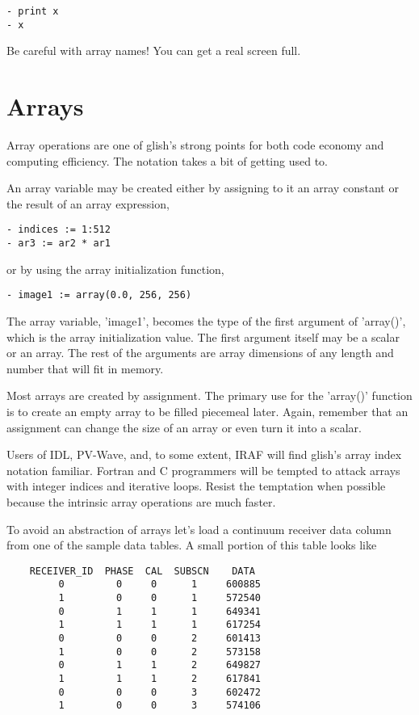 \begin{verbatim}
- print x
- x
\end{verbatim}

Be careful with array names!  You can get a real screen full.

\section{Arrays}

    Array operations are one of glish's strong points for both code economy
and computing efficiency.  The notation takes a bit of getting used to.

    An array variable may be created either by assigning to it an array
constant or the result of an array expression,

\begin{verbatim}
- indices := 1:512
- ar3 := ar2 * ar1
\end{verbatim}

or by using the array initialization function,

\begin{verbatim}
- image1 := array(0.0, 256, 256)
\end{verbatim}

The array variable, 'image1', becomes the type of the first argument of
'array()', which is the array initialization value.  The first argument
itself may be a scalar or an array.  The rest of the arguments are array
dimensions of any length and number that will fit in memory.

    Most arrays are created by assignment.  The primary use for the
'array()' function is to create an empty array to be filled piecemeal
later.  Again, remember that an assignment can change the size of an array
or even turn it into a scalar.

    Users of IDL, PV-Wave, and, to some extent, IRAF will find glish's
array index notation familiar.  Fortran and C programmers will be tempted
to attack arrays with integer indices and iterative loops.  Resist the
temptation when possible because the intrinsic array operations are much
faster.

    To avoid an abstraction of arrays let's load a continuum receiver data
column from one of the sample data tables.  A small portion of this table
looks like

\begin{verbatim}
	RECEIVER_ID  PHASE  CAL  SUBSCN    DATA
	     0         0     0      1     600885
	     1         0     0      1     572540
	     0         1     1      1     649341
	     1         1     1      1     617254
	     0         0     0      2     601413
	     1         0     0      2     573158
	     0         1     1      2     649827
	     1         1     1      2     617841
	     0         0     0      3     602472
	     1         0     0      3     574106
\end{verbatim}

